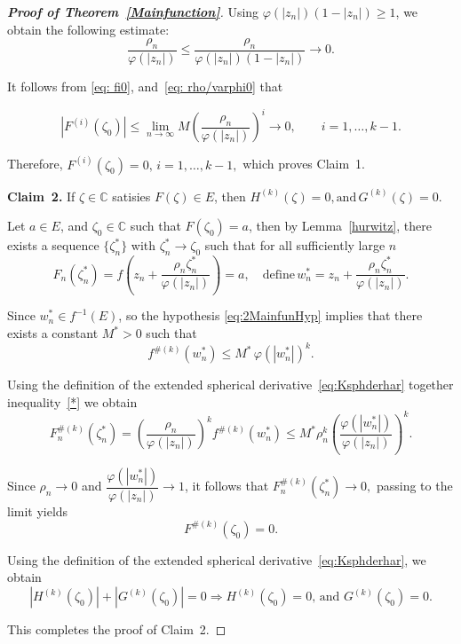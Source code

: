 \documentclass[11pt, reqno]{amsart}
\numberwithin{equation}{section}
\theoremstyle{definition}
\theoremstyle{remark}
\theoremstyle{plain}
\begin{document}
\begin{proof}[\bf{Proof of Theorem~\ref{Mainfunction}}]
Using $\varphi(|z_n|)(1-|z_n|)\geq1$, we obtain the following estimate:
\begin{equation}\label{eq: rho/varphi0}
  \frac{\rho_n}{\varphi(|z_n|)}\leq\frac{\rho_n}
{\varphi(|z_n|)(1-|z_n|)}\longrightarrow 0.
\end{equation}

It follows from \eqref{eq: fi0}, and~\eqref{eq: rho/varphi0} that

\[
|F^{(i)}(\zeta_0)|
\leq
\lim_{n\to\infty}
M
\left(
\frac{\rho_n}{\varphi(|z_n|)}
\right)^i \longrightarrow 0,
\qquad
i=1,\ldots,k-1.
\]

Therefore, $
F^{(i)}(\zeta_0)=0,
\,
i=1,\ldots,k-1,
$
which proves Claim~1.
\smallskip

\noindent
\textbf{Claim~2.}
If $\zeta \in \mathbb{C}$ satisies $F(\zeta)\in E$, then
$
H^{(k)}(\zeta)=0,
\text{and}\,
G^{(k)}(\zeta)=0.
$\smallskip

Let $a\in E$, and $\zeta_{0}\in \mathbb{C}$ such that
$F(\zeta_{0})=a$,
then by Lemma~\ref{hurwitz}, there exists a 
sequence $\{\zeta_n^*\}$ with
$\zeta_n^*\to\zeta_0$ such that for all sufficiently large $n$
\[
F_n(\zeta_n^*)
=
f\!\left(
z_n+\frac{\rho_n\zeta_n^*}{\varphi(|z_n|)}
\right)
=a, \quad \text{define}\, w_n^*
=
z_n+\frac{\rho_n\zeta_n^*}{\varphi(|z_n|)}.
\]

Since $w_n^*\in f^{-1}(E)$, so the hypothesis \eqref{eq:2MainfunHyp}
 implies that there exists
a constant $M^*>0$ such that
\begin{equation}\label{*}
  f^{\#(k)}(w_n^*)
\leq
M^*\,\varphi(|w_n^*|)^k.
\end{equation}

Using the definition of the extended spherical
 derivative~\eqref{eq:Ksphderhar} together inequality~\eqref{*}
we obtain
\[
F_n^{\#(k)}(\zeta_n^*)
=
\left(\frac{\rho_n}{\varphi(|z_n|)}\right)^k
f^{\#(k)}(w_n^*)\leq
M^*\rho_n^k
\left(
\frac{\varphi(|w_n^*|)}
{\varphi(|z_n|)}
\right)^k.
\]

Since $\rho_n\to0$ and
$\dfrac{\varphi(|w_n^*|)}{\varphi(|z_n|)}
\longrightarrow1$, it follows that
$
F_n^{\#(k)}(\zeta_n^*)\longrightarrow 0,
$ passing to the limit yields
\[
F^{\#(k)}(\zeta_0)=0.
\]

Using the definition of the extended spherical 
derivative~\eqref{eq:Ksphderhar},
we obtain
\[
|H^{(k)}(\zeta_0)|+|G^{(k)}(\zeta_0)|=0 \Longrightarrow H^{(k)}(\zeta_0)=0,
\, \text{and}\,\,
G^{(k)}(\zeta_0)=0.
\]

This completes the proof of Claim~2.
\smallskip


\end{proof}
\end{document}
